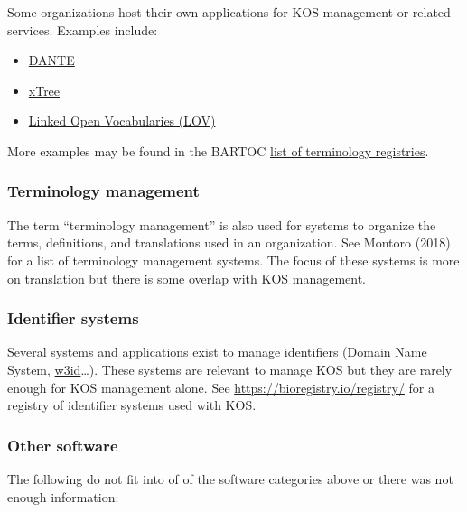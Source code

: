 \documentclass[
  DIV=10]{article}
\providecommand{\tightlist}{%
  \setlength{\itemsep}{0pt}\setlength{\parskip}{0pt}}\usepackage{longtable,booktabs,array}
\begin{document}
Some organizations host their own applications for KOS management or
related services. Examples include:

\begin{itemize}
\tightlist
\item
  \href{https://doi.org/10.11588/akmb.2018.1.63475}{DANTE}
\item
  \href{https://xtree-public.digicult-verbund.de/}{xTree}
\item
  \href{http://lov.okfn.org/dataset/lov/}{Linked Open Vocabularies
  (LOV)}
\end{itemize}

More examples may be found in the BARTOC
\href{https://bartoc.org/registries}{list of terminology registries}.

\subsubsection{Terminology management}\label{terminology-management}

The term ``terminology management'' is also used for systems to organize
the terms, definitions, and translations used in an organization. See
Montoro (2018) for a list of terminology management systems. The focus
of these systems is more on translation but there is some overlap with
KOS management.

\subsubsection{Identifier systems}\label{identifier-systems}

Several systems and applications exist to manage identifiers (Domain
Name System, \href{https://w3id.org/}{w3id}\ldots). These systems are
relevant to manage KOS but they are rarely enough for KOS management
alone. See \url{https://bioregistry.io/registry/} for a registry of
identifier systems used with KOS.

\subsubsection{Other software}\label{other-software}

The following do not fit into of of the software categories above or
there was not enough information:
\end{document}
